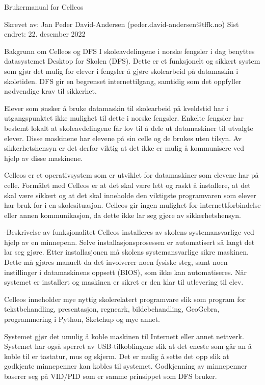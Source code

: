 




Brukermanual for Celleos

Skrevet av: Jan Peder David-Andersen (peder.david-andersen@tffk.no)
Sist endret: 22. desember 2022

Bakgrunn om Celleos og DFS
I skoleavdelingene i norske fengsler i dag benyttes datasystemet Desktop for Skolen (DFS). Dette er et funksjonelt og sikkert system som gjør det mulig for elever i fengsler å gjøre skolearbeid på datamaskin i skoletiden. DFS gir en begrenset internettilgang, samtidig som det oppfyller nødvendige krav til sikkerhet.

Elever som ønsker å bruke datamaskin til skolearbeid på kveldstid har i utgangspunktet ikke mulighet til dette i norske fengsler. Enkelte fengsler har bestemt lokalt at skoleavdelingene får lov til å dele ut datamaskiner til utvalgte elever. Disse maskinene har elevene på sin celle og de brukes uten tilsyn. Av sikkerhetshensyn er det derfor viktig at det ikke er mulig å kommunisere ved hjelp av disse maskinene.

Celleos er et operativsystem som er utviklet for datamaskiner som elevene har på celle. Formålet med Celleos er at det skal være lett og raskt å installere, at det skal være sikkert og at det skal inneholde den viktigste programvaren som elever har bruk for i en skolesituasjon. Celleos gir ingen mulighet for internettforbindelse eller annen kommunikasjon, da dette ikke lar seg gjøre av sikkerhetshensyn.

-Beskrivelse av funksjonalitet
Celleos installeres av skolens systemansvarlige ved hjelp av en minnepenn. Selve installasjonsprosessen er automatisert så langt det lar seg gjøre. Etter installasjonen må skolens systemansvarlige sikre maskinen. Dette må gjøres manuelt da det involverer noen fysiske steg, samt noen instillinger i datamaskinens oppsett (BIOS), som ikke kan automatiseres. Når systemet er installert og maskinen er sikret er den klar til utlevering til elev.

Celleos inneholder mye nyttig skolerelatert programvare slik som program for tekstbehandling, presentasjon, regneark, bildebehandling, GeoGebra, programmering i Python, Sketchup og mye annet.

Systemet gjør det umulig å koble maskinen til Internett eller annet nettverk. Systemet har også sperret av USB-tilkoblingene slik at det eneste som går an å koble til er tastatur, mus og skjerm. Det er mulig å sette det opp slik at godkjente minnepenner kan kobles til systemet. Godkjenning av minnepenner baserer seg på VID/PID som er samme prinsippet som DFS bruker.


